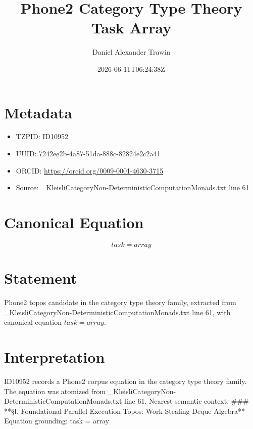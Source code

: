 \documentclass[11pt]{article}
\title{Phone2 Category Type Theory Task Array}
\author{Daniel Alexander Trawin}
\date{2026-06-11T06:24:38Z}
\begin{document}
\maketitle
\section*{Metadata}
\begin{itemize}
\item TZPID: ID10952
\item UUID: 7242ee2b-4a87-51da-888c-82824e2c2a41
\item ORCID: \url{https://orcid.org/0009-0001-4630-3715}
\item Source: _KleisliCategoryNon-DeterministicComputationMonads.txt line 61
\end{itemize}
\section*{Canonical Equation}
\[
task = array
\]
\section*{Statement}
Phone2 topos candidate in the category type theory family, extracted from _KleisliCategoryNon-DeterministicComputationMonads.txt line 61, with canonical equation $task = array$.
\section*{Interpretation}
ID10952 records a Phone2 corpus equation in the category type theory family. The equation was atomized from _KleisliCategoryNon-DeterministicComputationMonads.txt line 61. Nearest semantic context: ### **§Ⅰ. Foundational Parallel Execution Topos: Work-Stealing Deque Algebra** Equation grounding: task = array
\end{document}
